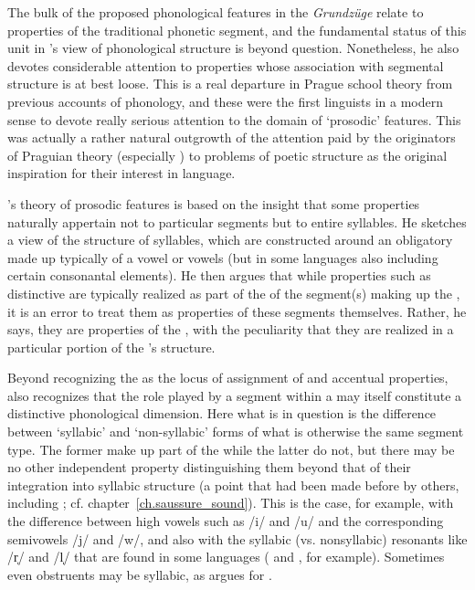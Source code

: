 The bulk of the proposed phonological features in the
\textsl{Grundzüge} relate to properties of the traditional phonetic
segment, and the fundamental status of this unit in {\Trubetzkoy}'s view
of phonological structure is beyond question. Nonetheless, he also
devotes considerable attention to properties whose association with
segmental structure is at best loose. This is a real departure in
Prague school theory from previous accounts of phonology, and these
were the first linguists in a modern sense to devote really serious
attention to the domain of `prosodic' features. This was actually a
rather natural outgrowth of the attention paid by the originators of
Praguian theory (especially {\Jakobson}) to problems of poetic structure
as the original inspiration for their interest in language.

{\Trubetzkoy}'s theory of prosodic features is based on the insight that
some properties naturally appertain not to particular segments but to
entire syllables. He sketches a view of the structure of syllables,
which are constructed around an obligatory  made up typically
of a vowel or vowels (but in some languages also including certain
consonantal elements). He then argues that while properties such as
distinctive  are typically realized as part of the  of
the segment(s) making up the , it is an error to treat them as
properties of these segments themselves. Rather, he says, they are
properties of the , with the peculiarity that they are
realized in a particular portion of the 's structure.

Beyond recognizing the  as the locus of assignment of  and
accentual properties, {\Trubetzkoy} also recognizes that the role played
by a segment within a  may itself constitute a distinctive
phonological dimension. Here what is in question is the difference
between `syllabic' and `non-syllabic' forms of what is otherwise the
same segment type. The former make up part of the  while the
latter do not, but there may be no other independent property
distinguishing them beyond that of their integration into syllabic
structure (a point that had been made before by others, including
{\Saussure}; cf. chapter~\ref{ch.saussure_sound}). This is the case, for
example, with the difference between high vowels such as /i/ and /u/
and the corresponding semivowels /j/ and /w/, and also with the
syllabic (vs. nonsyllabic) resonants like /r̩/ and /l̩/ that are found
in some languages ( and , for example). Sometimes
even obstruents may be syllabic, as {\Trubetzkoy} argues for .

